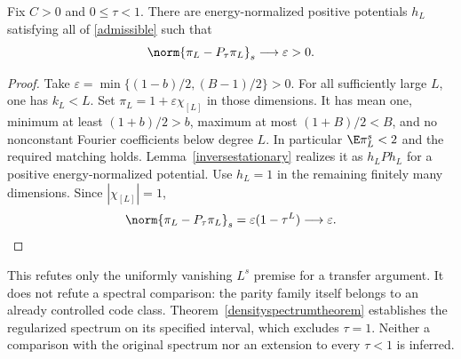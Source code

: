 \begin{proposition}\label{densityperturbationfailure}
Fix $C>0$ and $0\leq\tau<1$. There are energy-normalized positive
potentials $h_L$ satisfying all of \eqref{admissible} such that
\[
 \norm{\pi_L-P_\tau\pi_L}_s\longrightarrow\varepsilon>0.
\]
\end{proposition}
\begin{proof}
Take $\varepsilon=\min\{(1-b)/2,(B-1)/2\}>0$. For all sufficiently
large $L$, one has $k_L<L$. Set $\pi_L=1+\varepsilon\chi_{[L]}$ in
those dimensions. It has mean one, minimum at least $(1+b)/2>b$,
maximum at most $(1+B)/2<B$, and no nonconstant Fourier coefficients
below degree $L$. In particular $\E\pi_L^s<2$ and the required matching
holds. Lemma~\ref{inversestationary} realizes it as $h_LPh_L$ for a
positive energy-normalized potential. Use $h_L=1$ in the remaining
finitely many dimensions. Since $|\chi_{[L]}|=1$,
\[
 \norm{\pi_L-P_\tau\pi_L}_s
       =\varepsilon(1-\tau^L)\longrightarrow\varepsilon.
\]
\end{proof}
This refutes only the uniformly vanishing $L^s$ premise for a transfer
argument. It does not refute a spectral comparison: the parity family
itself belongs to an already controlled code class. Theorem~\ref{densityspectrumtheorem}
establishes the regularized spectrum on its specified interval, which
excludes $\tau=1$. Neither a comparison with the original spectrum nor
an extension to every $\tau<1$ is inferred.
